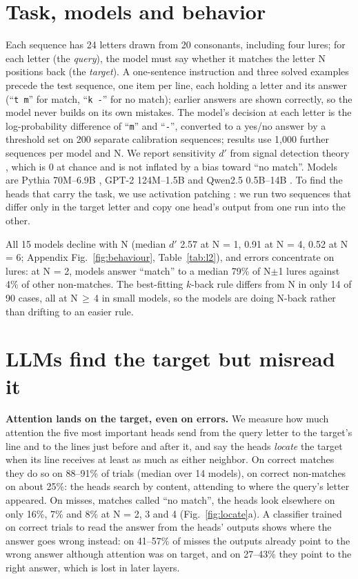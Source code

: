 \documentclass{article}
\newcommand{\dprime}{$d'$}
\begin{document}
\section{Task, models and behavior}
\label{sec:setup}

Each sequence has 24 letters drawn from 20 consonants, including four lures; for each letter (the \emph{query}), the model must say whether it matches the letter N positions back (the \emph{target}). A one-sentence instruction and three solved examples precede the test sequence, one item per line, each holding a letter and its answer (``\texttt{t m}'' for match, ``\texttt{k -}'' for no match); earlier answers are shown correctly, so the model never builds on its own mistakes. The model's decision at each letter is the log-probability difference of ``\texttt{m}'' and ``\texttt{-}'', converted to a yes/no answer by a threshold set on 200 separate calibration sequences; results use 1,000 further sequences per model and N. We report sensitivity \dprime{} from signal detection theory \citep{hautus1995corrections}, which is 0 at chance and is not inflated by a bias toward ``no match''. Models are Pythia 70M--6.9B \citep{biderman2023pythia}, GPT-2 124M--1.5B \citep{radford2019gpt2} and Qwen2.5 0.5B--14B \citep{qwen2025qwen25}. To find the heads that carry the task, we use activation patching \citep{zhang2024patching}: we run two sequences that differ only in the target letter and copy one head's output from one run into the other.

All 15 models decline with N (median \dprime{} 2.57 at N = 1, 0.91 at N = 4, 0.52 at N = 6; Appendix Fig.~\ref{fig:behaviour}, Table~\ref{tab:l2}), and errors concentrate on lures: at N = 2, models answer ``match'' to a median 79\% of N$\pm$1 lures against 4\% of other non-matches. The best-fitting $k$-back rule differs from N in only 14 of 90 cases, all at N$\,\ge\,$4 in small models, so the models are doing N-back rather than drifting to an easier rule.

\section{LLMs find the target but misread it}
\label{sec:locate}

\textbf{Attention lands on the target, even on errors.} We measure how much attention the five most important heads send from the query letter to the target's line and to the lines just before and after it, and say the heads \emph{locate} the target when its line receives at least as much as either neighbor. On correct matches they do so on 88--91\% of trials (median over 14 models), on correct non-matches on about 25\%: the heads search by content, attending to where the query's letter appeared. On misses, matches called ``no match'', the heads look elsewhere on only 16\%, 7\% and 8\% at N = 2, 3 and 4 (Fig.~\ref{fig:locate}a). A classifier trained on correct trials to read the answer from the heads' outputs shows where the answer goes wrong instead: on 41--57\% of misses the outputs already point to the wrong answer although attention was on target, and on 27--43\% they point to the right answer, which is lost in later layers.
\end{document}
